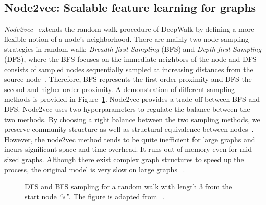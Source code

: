 \subsection{Node2vec: Scalable feature learning for graphs }
\label{subsec:node2vec}
\emph{Node2vec}~ extends the random walk procedure of DeepWalk by defining a more flexible notion of a node’s neighborhood. There are mainly two node sampling strategies in random walk: \emph{Breadth-first Sampling} (BFS) and \emph{Depth-first Sampling} (DFS), where the BFS focuses on the immediate neighbors of the node and DFS consists of sampled nodes sequentially sampled at increasing distances from the source node~.
Therefore, BFS represents the first-order proximity and DFS the second and higher-order proximity. A demonstration of different sampling methods is provided in Figure~\ref{fig:dfs_bfs}. Node2vec provides a trade-off between BFS and DFS. Node2vec uses two hyperparameters to regulate the balance between the two methods. By choosing a right balance between the two sampling methods, we preserve community structure as well as structural equivalence between nodes~.
However, the node2vec method tends to be quite inefficient for large graphs and incurs significant space and time overhead. It runs out of memory even for mid-sized graphs. Although there exist complex graph structures to speed up the process, the original model is very slow on large graphs ~. 
\begin{figure}
\centering 
\resizebox{0.45\textwidth}{0.25\textwidth}{      

}
\caption{DFS and BFS sampling for a random walk with length $3$ from the start node \emph{``s''}. The figure is adapted from ~.}
\label{fig:dfs_bfs}
\end{figure}
